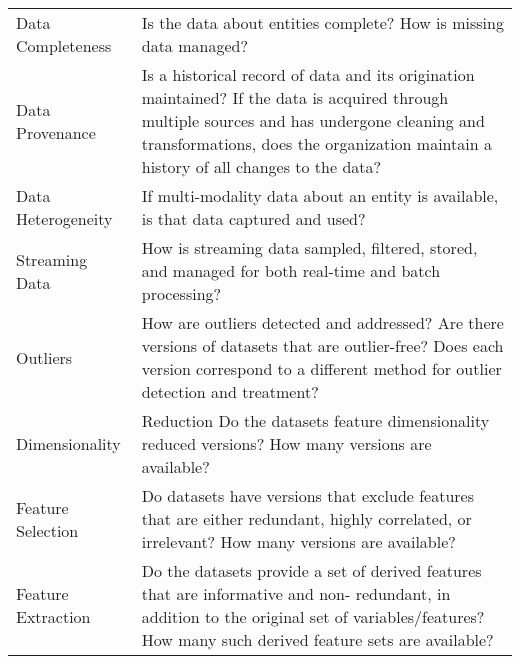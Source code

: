 \begin{table}
\begin{tabular}{p{4.0cm} p{10cm}}
Data Completeness & 
Is the data about entities complete? How is missing data managed? 
\\
Data Provenance & 
Is a historical record of data and its origination maintained? If the data is acquired
through multiple sources and has undergone cleaning and transformations, does
the organization maintain a history of all changes to the data? 
\\
Data Heterogeneity & 
If multi-modality data about an entity is available, is that data captured and used? 
\\
Streaming Data & 
How is streaming data sampled, filtered, stored, and managed for both real-time
and batch processing? 
\\
Outliers & 
How are outliers detected and addressed? Are there versions of datasets that
are outlier-free? Does each version correspond to a different method for outlier
detection and treatment? 
\\
Dimensionality &
Reduction Do the datasets feature dimensionality reduced versions? How many versions are
available? \\
Feature Selection & 
Do datasets have versions that exclude features that are either redundant, highly
correlated, or irrelevant? How many versions are available? 
\\
Feature Extraction & 
Do the datasets provide a set of derived features that are informative and non-
redundant, in addition to the original set of variables/features? How many such
derived feature sets are available? 
\\
\bottomrule
\end{tabular}
\end{table}


